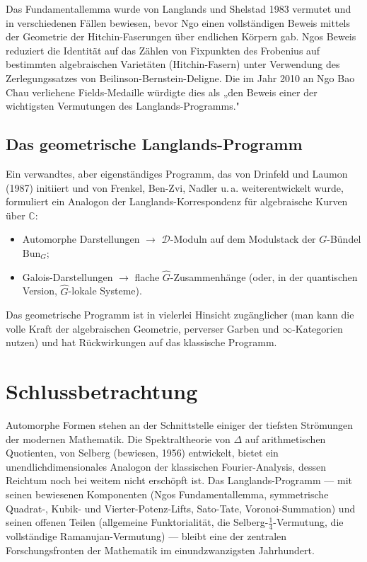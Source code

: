 \documentclass[12pt,a4paper]{amsart}
\theoremstyle{definition}
\newcommand{\CC}{\mathbb{C}}
\begin{document}
Das Fundamentallemma wurde von Langlands und Shelstad 1983 vermutet und in
verschiedenen Fällen bewiesen, bevor Ngo einen vollständigen Beweis mittels der
Geometrie der Hitchin-Faserungen über endlichen Körpern gab. Ngos Beweis reduziert
die Identität auf das Zählen von Fixpunkten des Frobenius auf bestimmten algebraischen
Varietäten (Hitchin-Fasern) unter Verwendung des Zerlegungssatzes von
Beilinson-Bernstein-Deligne. Die im Jahr 2010 an Ngo Bao Chau verliehene Fields-Medaille
würdigte dies als „den Beweis einer der wichtigsten Vermutungen des Langlands-Programms."

\subsection{Das geometrische Langlands-Programm}

Ein verwandtes, aber eigenständiges Programm, das von Drinfeld und Laumon (1987)
initiiert und von Frenkel, Ben-Zvi, Nadler u.\,a. weiterentwickelt wurde, formuliert
ein Analogon der Langlands-Korrespondenz für algebraische Kurven über $\CC$:
\begin{itemize}
\item Automorphe Darstellungen $\to$ $\mathcal{D}$-Moduln auf dem Modulstack der
  $G$-Bündel $\mathrm{Bun}_G$;
\item Galois-Darstellungen $\to$ flache $\hat{G}$-Zusammenhänge (oder, in der
  quantischen Version, $\hat{G}$-lokale Systeme).
\end{itemize}
Das geometrische Programm ist in vielerlei Hinsicht zugänglicher (man kann die
volle Kraft der algebraischen Geometrie, perverser Garben und $\infty$-Kategorien
nutzen) und hat Rückwirkungen auf das klassische Programm.

\section*{Schlussbetrachtung}

Automorphe Formen stehen an der Schnittstelle einiger der tiefsten Strömungen
der modernen Mathematik. Die Spektraltheorie von $\Delta$ auf arithmetischen
Quotienten, von Selberg (bewiesen, 1956) entwickelt, bietet ein unendlichdimensionales
Analogon der klassischen Fourier-Analysis, dessen Reichtum noch bei weitem nicht
erschöpft ist. Das Langlands-Programm — mit seinen bewiesenen Komponenten
(Ngos Fundamentallemma, symmetrische Quadrat-, Kubik- und Vierter-Potenz-Lifts,
Sato-Tate, Voronoi-Summation) und seinen offenen Teilen (allgemeine Funktorialität,
die Selberg-$\tfrac{1}{4}$-Vermutung, die vollständige Ramanujan-Vermutung) —
bleibt eine der zentralen Forschungsfronten der Mathematik im einundzwanzigsten Jahrhundert.
\end{document}
